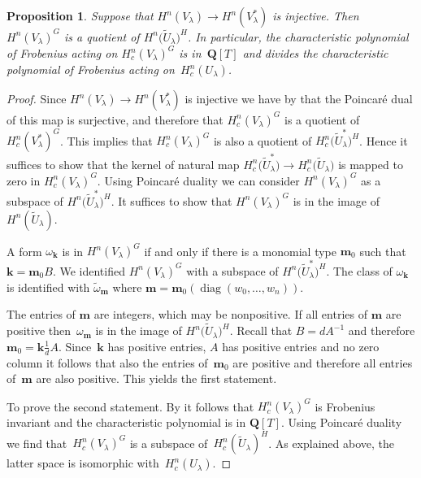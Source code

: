 \documentclass[pdftex]{sigma}
\numberwithin{equation}{section}
\newtheorem{Proposition}[Theorem]{Proposition}
 { \theoremstyle{definition}
\newtheorem{Definition}[Theorem]{Definition}
\newtheorem{notation}[Theorem]{Notation}
\newtheorem{Example}[Theorem]{Example}
\newtheorem{Remark}[Theorem]{Remark} }
\DeclareMathOperator{\diag}{diag}
\begin{document}
\begin{Proposition}\label{prpFactor} Suppose that $H^n(V_\lambda)\to H^n(V_{\lambda}^*)$ is injective. Then $H^n(V_{\lambda})^G$ is a quotient of $H^n\big(\tilde{U}_{\lambda}\big)^H$. In particular, the characteristic polynomial of Frobenius acting on $H^n_c(V_{\lambda})^G$ is in~$\mathbf{Q}[T]$ and divides the characteristic polynomial of Frobenius acting on~$H^n_c(U_{\lambda})$.
\end{Proposition}

\begin{proof}Since $H^n(V_\lambda)\to H^n(V_{\lambda}^*)$ is injective we have by \cite{BerPoi} that the Poincar\'e dual of this map is surjective, and therefore that $H^n_c(V_\lambda)^G$ is a quotient of~$H^n_c(V_\lambda^*)^G$. This implies that $H^n_c(V_\lambda)^G$ is also a quotient of $H^n_c\big(\tilde{U}^*_\lambda\big)^H$. Hence it suf\/f\/ices to show that the kernel of natural map $H^n_c\big(\tilde{U}^*_\lambda\big)\to H^n_c\big(\tilde{U}_\lambda\big)$ is mapped to zero in $H^n_c(V_\lambda)^G$. Using Poincar\'e duality we can consider $H^n(V_\lambda)^G$ as a subspace of $H^n\big(\tilde{U}_{\lambda}^*\big)^H$. It suf\/f\/ices to show that $H^n(V_\lambda)^G$ is in the image of~$H^n(\tilde{U}_\lambda)$.

A form $\omega_{\mathbf{k}}$ is in $H^n(V_\lambda)^G$ if and only if there is a monomial type $\mathbf{m}_0$ such that $\mathbf{k}=\mathbf{m}_0 B$. We identif\/ied $H^n(V_\lambda)^G$ with a subspace of $H^n\big(\tilde{U}_\lambda^*\big)^H$. The class of $\omega_{\mathbf{k}}$ is identif\/ied with $\tilde{\omega}_{\mathbf{m}}$ where $\mathbf{m}=\mathbf{m}_0(\diag(w_0,\dots,w_n))$.

The entries of $\mathbf{m}$ are integers, which may be nonpositive. If all entries of $\mathbf{m}$ are positive then~$\omega_{\mathbf{m}}$ is in the image of $H^n\big(\tilde{U}_{\lambda}\big)^ H$. Recall that $B=d A^{-1}$ and therefore $\mathbf{m}_0=\mathbf{k} \frac{1}{d} A $. Since~$\mathbf{k}$ has positive entries, $A$ has positive entries and no zero column it follows that also the entries of~$\mathbf{m}_0$ are positive and therefore all entries of~$\mathbf{m}$ are also positive. This yields the f\/irst statement.

To prove the second statement. By \cite[Lemma~4.3]{Zetafamrec} it follows that $H^n_c(V_\lambda)^G$ is Frobenius invariant and the characteristic polynomial is in $\mathbf{Q}[T]$. Using Poincar\'e duality we f\/ind that~$H^n_c(V_\lambda)^G$ is a subspace of~$H^n_c(\tilde{U}_\lambda)^H$. As explained above, the latter space is isomorphic with~$H^n_c(U_\lambda)$.
\end{proof}
\end{document}
